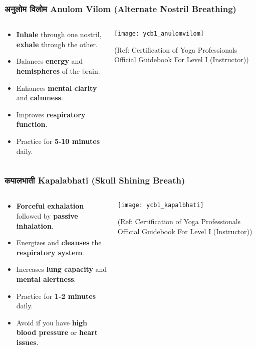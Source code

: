 \begin{frame}[fragile]\frametitle{अनुलोम विलोम Anulom Vilom (Alternate Nostril Breathing)}
\begin{columns}
    \begin{column}[T]{0.5\linewidth}
      \begin{itemize}
        \item \textbf{Inhale} through one nostril, \textbf{exhale} through the other.
        \item Balances \textbf{energy} and \textbf{hemispheres} of the brain.
        \item Enhances \textbf{mental clarity} and \textbf{calmness}.
        \item Improves \textbf{respiratory function}.
        \item Practice for \textbf{5-10 minutes} daily.
      \end{itemize}
    \end{column}
    \begin{column}[T]{0.5\linewidth}
        \begin{center}
        \texttt{[image: ycb1\_anulomvilom]}
				
		{\tiny (Ref: Certification  of Yoga Professionals Official Guidebook For Level I (Instructor))}	  
        \end{center}	
    \end{column}
\end{columns}
\end{frame}

\begin{frame}[fragile]\frametitle{कपालभाती  Kapalabhati (Skull Shining Breath)}
\begin{columns}
    \begin{column}[T]{0.5\linewidth}
      \begin{itemize}
        \item \textbf{Forceful exhalation} followed by \textbf{passive inhalation}.
        \item Energizes and \textbf{cleanses} the \textbf{respiratory system}.
        \item Increases \textbf{lung capacity} and \textbf{mental alertness}.
        \item Practice for \textbf{1-2 minutes} daily.
        \item Avoid if you have \textbf{high blood pressure} or \textbf{heart issues}.
      \end{itemize}
    \end{column}
    \begin{column}[T]{0.5\linewidth}
        \begin{center}
        \texttt{[image: ycb1\_kapalbhati]}
				
		{\tiny (Ref: Certification  of Yoga Professionals Official Guidebook For Level I (Instructor))}	 
        \end{center}	
    \end{column}
\end{columns}
\end{frame}

